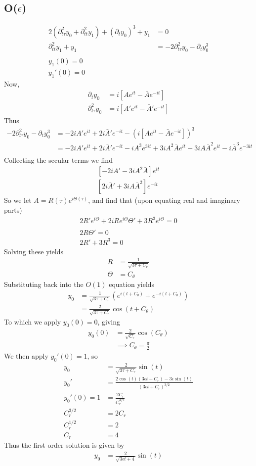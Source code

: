 \documentclass[12pt]{article}
\newcommand{\eq}[1]{\begin{align*}#1\end{align*}}
\newcommand{\p}[1]{\partial_{#1}}
\newcommand{\pp}[1]{\partial^2_{#1}}
\begin{document}
\subsection*{O($\epsilon$)}
\eq{
	2(\pp{t\tau}y_0 + \pp{tt}y_1) + (\p{t}y_0)^3 + y_1 &= 0\\
	\pp{tt}y_1 + y_1 &= -2\pp{t\tau}y_0 - \p{t}y_0^3\\
	\\
	y_1(0) = 0\\
	y_1'(0) = 0
}
Now,
\eq{
	\p{t}y_0 &= i\left[Ae^{it} - \bar{A}e^{-it}\right]\\
	\pp{t\tau}y_0 &= i\left[A'e^{it} - \bar{A}'e^{-it}\right]
}
Thus
\eq{
	-2\pp{t\tau}y_0 - \p{t}y_0^3 &= -2iA'e^{it} + 2i\bar{A}'e^{-it} - (i\left[Ae^{it} - \bar{A}e^{-it}\right])^3\\
	&= -2iA'e^{it} + 2i\bar{A}'e^{-it} - iA^3e^{3it} + 3iA^2\bar{A}e^{it} - 3iA\bar{A}^2e^{it} - i\bar{A}^3e^{-3it}\\
}
Collecting the secular terms we find
\eq{
	\left[-2iA' - 3iA^2\bar{A}\right]e^{it}\\
	\left[2i\bar{A}' + 3iA\bar{A}^2\right]e^{-it}
}
So we let $A = R(\tau)e^{i\Theta(\tau)}$, and find that (upon equating real and imaginary parts)
\eq{
	2R'e^{i\Theta} + 2iRe^{i\Theta}\Theta' + 3R^3e^{i\Theta} = 0\\
	\\
	2R\Theta' = 0\\
	2R' + 3R^3 = 0
}
Solving these yields
\eq{
	R &= \frac{1}{\sqrt{3\tau + C_r}}\\
	\Theta &= C_\theta
}
Substituting back into the $O(1)$ equation yields
\eq{
	y_0 &= \frac{1}{\sqrt{3\tau + C_r}}\left( e^{i(t + C_\theta)} + e^{-i(t + C_\theta)} \right)\\
	&= \frac{2}{\sqrt{3\tau + C_r}}\cos(t+C_\theta)
}
To which we apply $y_0(0) = 0$, giving
\eq{
	y_0(0) &= \frac{2}{\sqrt{C_r}}\cos(C_\theta)\\
	&\implies C_\theta = \frac{\pi}{2}
}
We then apply $y_0'(0) = 1$, so
\eq{
	y_0 &= \frac{2}{\sqrt{3\tau + C_r}}\sin(t)\\
	y_0' &= \frac{2\cos(t)(3\epsilon t + C_r) - 3\epsilon\sin(t)}{(3\epsilon t + C_r)^{3/2}}\\
	y_0'(0) = 1 &= \frac{2C_r}{C_r^{3/2}}\\
	C_r^{3/2} &= 2C_r\\
	C_r^{1/2} &= 2\\
	C_r &= 4
}
Thus the first order solution is given by
\eq{
	y_0 &= \frac{2}{\sqrt{3\epsilon t + 4}}\sin(t)
}
\end{document}
